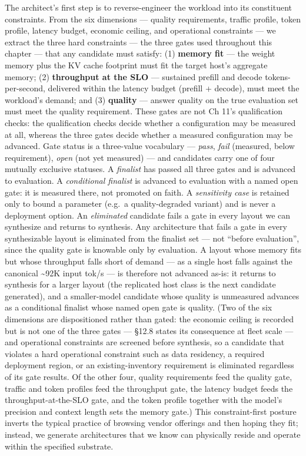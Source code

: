 The architect's first step is to reverse-engineer the workload into its
constituent constraints. From the six dimensions --- quality
requirements, traffic profile, token profile, latency budget, economic
ceiling, and operational constraints --- we extract the three hard
constraints --- the three gates used throughout this chapter --- that
any candidate must satisfy: (1) \textbf{memory fit} --- the weight
memory plus the KV cache footprint must fit the target host's aggregate
memory; (2) \textbf{throughput at the SLO} --- sustained prefill and
decode tokens-per-second, delivered within the latency budget (prefill +
decode), must meet the workload's demand; and (3) \textbf{quality} ---
answer quality on the true evaluation set must meet the quality
requirement. These gates are not Ch 11's qualification checks: the
qualification checks decide whether a configuration may be measured at
all, whereas the three gates decide whether a measured configuration may
be advanced. Gate status is a three-value vocabulary --- \emph{pass},
\emph{fail} (measured, below requirement), \emph{open} (not yet
measured) --- and candidates carry one of four mutually exclusive
statuses. A \emph{finalist} has passed all three gates and is advanced
to evaluation. A \emph{conditional finalist} is advanced to evaluation
with a named open gate: it is measured there, not promoted on faith. A
\emph{sensitivity case} is retained only to bound a parameter (e.g.~a
quality-degraded variant) and is never a deployment option. An
\emph{eliminated} candidate fails a gate in every layout we can
synthesize and returns to synthesis. Any architecture that fails a gate
in every synthesizable layout is eliminated from the finalist set ---
not ``before evaluation'', since the quality gate is knowable only by
evaluation. A layout whose memory fits but whose throughput falls short
of demand --- as a single host falls against the canonical
\textasciitilde92K input tok/s --- is therefore not advanced as-is: it
returns to synthesis for a larger layout (the replicated host class is
the next candidate generated), and a smaller-model candidate whose
quality is unmeasured advances as a conditional finalist whose named
open gate is quality. (Two of the six dimensions are dispositioned
rather than gated: the economic ceiling is recorded but is not one of
the three gates --- §12.8 states its consequence at fleet scale --- and
operational constraints are screened before synthesis, so a candidate
that violates a hard operational constraint such as data residency, a
required deployment region, or an existing-inventory requirement is
eliminated regardless of its gate results. Of the other four, quality
requirements feed the quality gate, traffic and token profiles feed the
throughput gate, the latency budget feeds the throughput-at-the-SLO
gate, and the token profile together with the model's precision and
context length sets the memory gate.) This constraint-first posture
inverts the typical practice of browsing vendor offerings and then
hoping they fit; instead, we generate architectures that we know can
physically reside and operate within the specified substrate.

